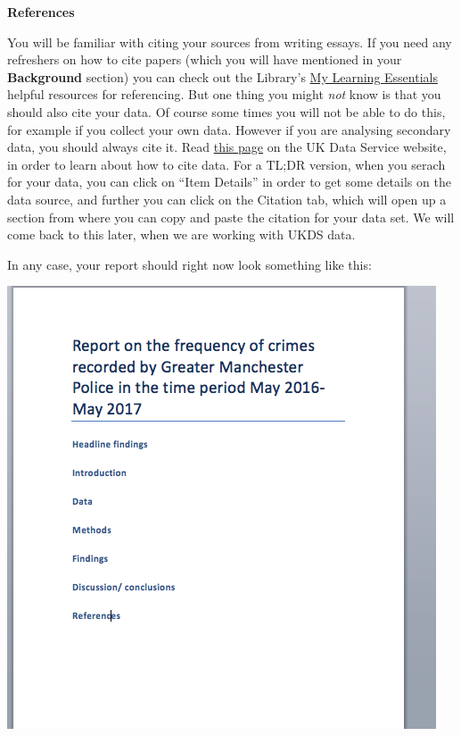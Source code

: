 \documentclass[
]{book}
\begin{document}
\textbf{References}

You will be familiar with citing your sources from writing essays. If you need any refreshers on how to cite papers (which you will have mentioned in your \textbf{Background} section) you can check out the Library's \href{http://www.library.manchester.ac.uk/using-the-library/students/training-and-skills-support/my-learning-essentials/online-resources/?level=3\&level1Link=2\&level2Links=referencing,}{My Learning Essentials} helpful resources for referencing. But one thing you might \emph{not} know is that you should also cite your data. Of course some times you will not be able to do this, for example if you collect your own data. However if you are analysing secondary data, you should always cite it. Read \href{https://www.ukdataservice.ac.uk/use-data/citing-data}{this page} on the UK Data Service website, in order to learn about how to cite data. For a TL;DR version, when you serach for your data, you can click on ``Item Details'' in order to get some details on the data source, and further you can click on the Citation tab, which will open up a section from where you can copy and paste the citation for your data set. We will come back to this later, when we are working with UKDS data.

In any case, your report should right now look something like this:

\includegraphics{imgs/writeup_outline.png}
\end{document}
